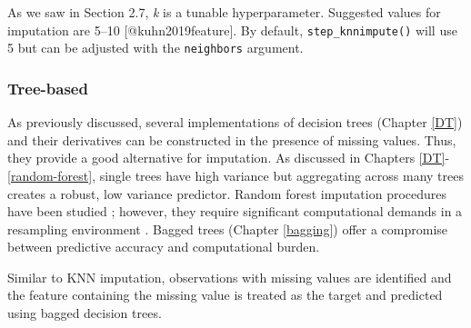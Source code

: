 \documentclass[]{krantz}
\makeatletter
\newenvironment{Shaded}{\begin{snugshade}}{\end{snugshade}}
\newcommand{\CommentTok}[1]{\textcolor[rgb]{0.37,0.37,0.37}{\textit{#1}}}
\newcommand{\DataTypeTok}[1]{\textcolor[rgb]{0.27,0.27,0.27}{#1}}
\newcommand{\DecValTok}[1]{\textcolor[rgb]{0.06,0.06,0.06}{#1}}
\newcommand{\KeywordTok}[1]{\textcolor[rgb]{0.27,0.27,0.27}{\textbf{#1}}}
\newcommand{\NormalTok}[1]{#1}
\newcommand{\OperatorTok}[1]{\textcolor[rgb]{0.43,0.43,0.43}{\textbf{#1}}}
\newcommand{\StringTok}[1]{\textcolor[rgb]{0.5,0.5,0.5}{#1}}
\newenvironment{kframe}{%
\medskip{}
\setlength{\fboxsep}{.8em}
 \def\at@end@of@kframe{}%
 \ifinner\ifhmode%
  \def\at@end@of@kframe{\end{minipage}}%
  \begin{minipage}{\columnwidth}%
 \fi\fi%
 \def\FrameCommand##1{\hskip\@totalleftmargin \hskip-\fboxsep
 \colorbox{shadecolor}{##1}\hskip-\fboxsep
     \hskip-\linewidth \hskip-\@totalleftmargin \hskip\columnwidth}%
 \MakeFramed {\advance\hsize-\width
   \@totalleftmargin\z@ \linewidth\hsize
   \@setminipage}}%
 {\par\unskip\endMakeFramed%
 \at@end@of@kframe}
\newenvironment{block}[1]
  {
  \begin{itemize}
  \renewcommand{\labelitemi}{
    \raisebox{-.7\height}[0pt][0pt]{
      {\setkeys{Gin}{width=3em,keepaspectratio}\texttt{[image: icons/\#1]}}
    }
  }
  \setlength{\fboxsep}{1em}
  \begin{kframe}
  \item
  }
  {
  \end{kframe}
  \end{itemize}
  }
\newenvironment{note}
  {\begin{block}{note}}
  {\end{block}}
\renewenvironment{Shaded}{\begin{kframe}}{\end{kframe}}
\makeatother
\begin{document}
\begin{note}
As we saw in Section 2.7, \emph{k} is a tunable hyperparameter.
Suggested values for imputation are 5--10 {[}@kuhn2019feature{]}. By
default, \texttt{step\_knnimpute()} will use 5 but can be adjusted with
the \texttt{neighbors} argument.
\end{note}

\begin{Shaded}
\end{Shaded}

\hypertarget{tree-based}{%
\subsubsection{Tree-based}\label{tree-based}}

As previously discussed, several implementations of decision trees (Chapter \ref{DT}) and their derivatives can be constructed in the presence of missing values. Thus, they provide a good alternative for imputation. As discussed in Chapters \ref{DT}-\ref{random-forest}, single trees have high variance but aggregating across many trees creates a robust, low variance predictor. Random forest imputation procedures have been studied \citep{shah2014comparison, stekhoven2015missforest}; however, they require significant computational demands in a resampling environment \citep{kuhn2019feature}. Bagged trees (Chapter \ref{bagging}) offer a compromise between predictive accuracy and computational burden.

Similar to KNN imputation, observations with missing values are identified and the feature containing the missing value is treated as the target and predicted using bagged decision trees.

\begin{Shaded}
\end{Shaded}
\end{document}
